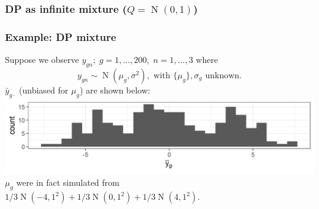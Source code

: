 \documentclass{beamer}
\newcommand{\op}{\operatorname}
\begin{document}
\begin{frame}%
  \frametitle{DP as infinite mixture ($Q=\op{N}(0,1)$)}
\end{frame}

\begin{frame}%
  \frametitle{Example: DP mixture}
  {
    \small Suppose we observe $y_{gn};\; g=1,\ldots,200,\; n=1,\ldots,3$ where\\
    \pause\[ y_{gn} \sim \op{N}(\mu_g,\sigma^2),\mbox{ with }\{\mu_g\},\sigma_g\mbox{ unknown.}\]
    \pause $\bar{y}_{g\cdot}$ (unbiased for $\mu_g$) are shown below:\\
    {
      \centering
      \includegraphics[width=.9\textwidth]{samplemeans_ie}
    }\\
  
    \pause $\mu_g$ were in fact simulated from $1/3\op{N}(-4,1^2) + 1/3\op{N}(0,1^2) + 1/3\op{N}(4,1^2)$.
  }
\end{frame}
\end{document}
